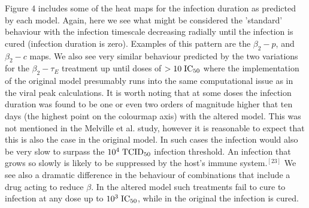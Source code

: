 \documentclass[a4paper,11pt]{article}
\begin{document}
Figure 4 includes some of the heat maps for the infection duration as predicted by each model. Again, here we see what might be considered the 'standard' behaviour with the infection timescale decreasing radially until the infection is cured (infection duration is zero). Examples of this pattern are the $\beta_2-p$, and $\beta_2-c$ maps. We also see very similar behaviour predicted by the two variations for the $\beta_2-\tau_E$ treatment up until doses of $>  10 \hspace{1mm} \mathrm{IC}_{50}$ where the implementation of the original model presumably runs into the same computational issue as in the viral peak calculations. It is worth noting that at some doses the infection duration was found to be one or even two orders of magnitude higher that ten days (the highest point on the colourmap axis) with the altered model. This was not mentioned in the Melville et al. study, however it is reasonable to expect that this is also the case in the original model. In such cases the infection would also be very slow to surpass the $10^4 \hspace{1mm} \mathrm{TCID}_{50}$ infection threshold. An infection that grows so slowly is likely to be suppressed by the host's immune system.$^{[23]}$ We see also a dramatic difference in the behaviour of combinations that include a drug acting to reduce $\beta$. In the altered model such treatments fail to cure to infection at any dose up to $10^3 \hspace{1mm} \mathrm{IC}_{50}$, while in the original the infection is cured. 
\end{document}
